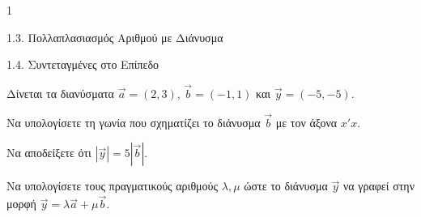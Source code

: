 \begin{ylh}{1}
    \item 1.3. Πολλαπλασιασμός Αριθμού με Διάνυσμα
    \item 1.4. Συντεταγμένες στο Επίπεδο
\end{ylh}
Δίνεται τα διανύσματα $\vec{a} = (2,3)$, $\vec{b} = (-1,1)$ και $\vec{y} = (-5,-5)$.
\begin{alist}
\item Να υπολογίσετε τη γωνία που σχηματίζει το διάνυσμα $\vec{b}$ με τον άξονα $x'x$. 
\item Να αποδείξετε ότι $|\vec{y}| = 5|\vec{b}|$. 
\item Να υπολογίσετε τους πραγματικούς αριθμούς $\lambda, \mu$ ώστε το διάνυσμα $\vec{y}$ να γραφεί στην μορφή $\vec{y} = \lambda\vec{a} + \mu\vec{b}$. 
\end{alist}